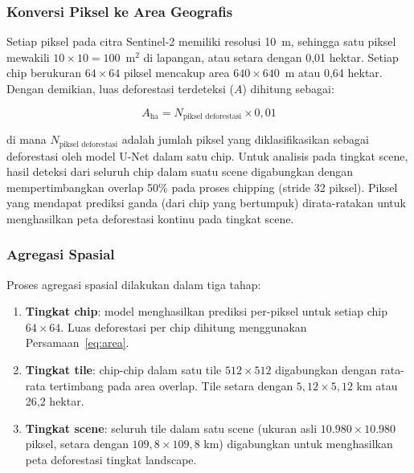 \documentclass[12pt,a4paper]{article}
\begin{document}
\subsubsection{Konversi Piksel ke Area Geografis}
\label{subsubsec:pixel2area}

Setiap piksel pada citra Sentinel-2 memiliki resolusi 10~m,
sehingga satu piksel mewakili $10 \times 10 = 100$~m${}^2$ di
lapangan, atau setara dengan 0,01 hektar. Setiap chip berukuran
$64 \times 64$ piksel mencakup area $640 \times 640$~m atau
0,64 hektar. Dengan demikian, luas deforestasi terdeteksi ($A$)
dihitung sebagai:

\begin{equation}
    \label{eq:area}
    A_{\text{ha}} = N_{\text{piksel deforestasi}} \times 0,01
\end{equation}

di mana $N_{\text{piksel deforestasi}}$ adalah jumlah piksel
yang diklasifikasikan sebagai deforestasi oleh model U-Net dalam
satu chip. Untuk analisis pada tingkat scene, hasil deteksi dari
seluruh chip dalam suatu scene digabungkan dengan mempertimbangkan
overlap 50\% pada proses chipping (stride 32 piksel). Piksel yang
mendapat prediksi ganda (dari chip yang bertumpuk) dirata-ratakan
untuk menghasilkan peta deforestasi kontinu pada tingkat scene.

\subsubsection{Agregasi Spasial}
\label{subsubsec:agregasi}

Proses agregasi spasial dilakukan dalam tiga tahap:

\begin{enumerate}[nosep]
    \item \textbf{Tingkat chip}: model menghasilkan prediksi
          per-piksel untuk setiap chip $64 \times 64$. Luas
          deforestasi per chip dihitung menggunakan
          Persamaan~\ref{eq:area}.
    \item \textbf{Tingkat tile}: chip-chip dalam satu tile
          $512 \times 512$ digabungkan dengan rata-rata
          tertimbang pada area overlap. Tile setara dengan
          $5,12 \times 5,12$ km atau 26,2 hektar.
    \item \textbf{Tingkat scene}: seluruh tile dalam satu scene
          (ukuran asli $10.980 \times 10.980$ piksel, setara
          dengan $109,8 \times 109,8$ km) digabungkan untuk
          menghasilkan peta deforestasi tingkat landscape.
\end{enumerate}
\end{document}
